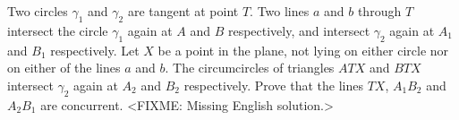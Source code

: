 \problem{}
Two circles $\gamma_1$ and $\gamma_2$ are tangent at point $T$.
Two lines $a$ and $b$ through $T$ intersect the circle $\gamma_1$ again at $A$ and $B$
respectively, and intersect $\gamma_2$ again at $A_1$ and $B_1$ respectively.
Let $X$ be a point in the plane, not lying on either circle nor on either of the lines
$a$ and $b$.
The circumcircles of triangles $ATX$ and $BTX$ intersect $\gamma_2$ again at $A_2$ and
$B_2$ respectively.
Prove that the lines $TX$, $A_1 B_2$ and $A_2 B_1$ are concurrent.
\solution
<FIXME: Missing English solution.>
\endproblem
